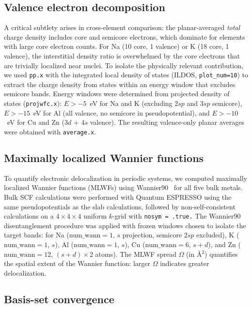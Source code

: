 \documentclass[twocolumn,showpacs,preprintnumbers,amsmath,amssymb,prb]{revtex4-2}
\begin{document}
\subsection{Valence electron decomposition}

A critical subtlety arises in cross-element comparison:
the planar-averaged \emph{total} charge density includes
core and semicore electrons, which dominate for elements
with large core electron counts.
For Na (10 core, 1 valence) or K (18 core, 1 valence),
the interstitial density ratio is overwhelmed by the
core electrons that are trivially localized near nuclei.
To isolate the physically relevant contribution, we used
\texttt{pp.x} with the integrated local density of states
(ILDOS, \texttt{plot\_num=10}) to extract the charge density
from states within an energy window that excludes semicore
bands.
Energy windows were determined from projected density of
states (\texttt{projwfc.x}):
$E > -5$~eV for Na and K (excluding 2$sp$ and 3$sp$ semicore),
$E > -15$~eV for Al (all valence, no semicore in pseudopotential),
and $E > -10$~eV for Cu and Zn (3$d$ + 4$s$ valence).
The resulting valence-only planar averages were obtained
with \texttt{average.x}.

\subsection{Maximally localized Wannier functions}

To quantify electronic delocalization in periodic systems,
we computed maximally localized Wannier functions (MLWFs)
using Wannier90~\cite{Pizzi2020} for all five bulk metals.
Bulk SCF calculations were performed with Quantum ESPRESSO
using the same pseudopotentials as the slab calculations,
followed by non-self-consistent calculations on a
$4 \times 4 \times 4$ uniform $k$-grid with \texttt{nosym = .true.}
The Wannier90 disentanglement procedure was applied with
frozen windows chosen to isolate the target bands:
for Na ($\mathrm{num\_wann} = 1$, $s$ projection,
semicore 2$sp$ excluded), K ($\mathrm{num\_wann} = 1$, $s$),
Al ($\mathrm{num\_wann} = 1$, $s$),
Cu ($\mathrm{num\_wann} = 6$, $s + d$),
and Zn ($\mathrm{num\_wann} = 12$, $(s + d) \times 2$ atoms).
The MLWF spread $\Omega$ (in \AA$^2$) quantifies the spatial
extent of the Wannier function: larger $\Omega$ indicates
greater delocalization.

\subsection{Basis-set convergence}
\label{sec:basis_convergence}
\end{document}
